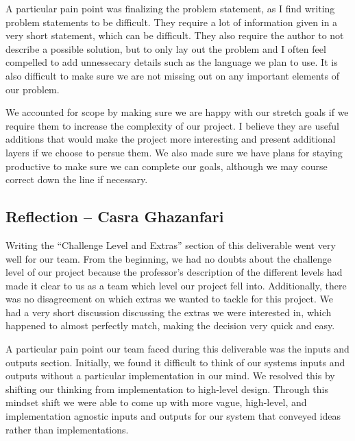 \documentclass{article}
\begin{document}
A particular pain point was finalizing the problem statement, as I find
writing problem statements to be difficult. They require a lot of information
given in a very short statement, which can be difficult. They also require
the author to not describe a possible solution, but to only lay out the
problem and I often feel compelled to add unnessecary details such as the
language we plan to use. It is also difficult to make sure we are not missing
out on any important elements of our problem.\newline

We accounted for scope by making sure we are happy with our stretch goals if
we require them to increase the complexity of our project. I believe they are
useful additions that would make the project more interesting and present
additional layers if we choose to persue them. We also made sure we have plans
for staying productive to make sure we can complete our goals, although we may
course correct down the line if necessary.

\subsection*{Reflection -- Casra Ghazanfari}

Writing the “Challenge Level and Extras” section of this deliverable went
very well for our team. From the beginning, we had no doubts about the challenge
level of our project because the professor’s description of the different levels
had made it clear to us as a team which level our project fell into.
Additionally, there was no disagreement on which extras we wanted to tackle for
this project. We had a very short discussion discussing the extras we were
interested in, which happened to almost perfectly match, making the decision
very quick and easy. \newline

A particular pain point our team faced during this deliverable was the inputs
and outputs section. Initially, we found it difficult to think of our systems
inputs and outputs without a particular implementation in our mind. We resolved
this by shifting our thinking from implementation to high-level design. Through
this mindset shift we were able to come up with more vague, high-level, and
implementation agnostic inputs and outputs for our system that conveyed ideas
rather than implementations. \newline
\end{document}
